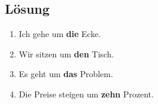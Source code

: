 \documentclass[a4paper,11pt]{article}
\newcommand{\Correct}[1]{\textcolor{HeaderBlueDark}{\textbf{#1}}}
\begin{document}
\subsection{Lösung}

\begin{enumerate}
    \item Ich gehe um \Correct{die} Ecke. 
    \item Wir sitzen um \Correct{den} Tisch.
    \item Es geht um \Correct{das} Problem.
    \item Die Preise steigen um \Correct{zehn} Prozent.
\end{enumerate}
\end{document}
